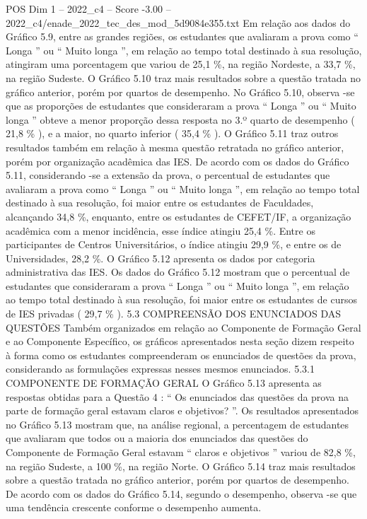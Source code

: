 \begin{textsample}{POS Dim 1 – 2022\_c4 – Score -3.00 – 2022\_c4/enade\_2022\_tec\_des\_mod\_5d9084e355.txt}
Em relação aos dados do Gráfico 5.9, entre as grandes regiões, os estudantes que avaliaram a prova como “ Longa ” ou “ Muito longa ”, em relação ao tempo total destinado à sua resolução, atingiram uma porcentagem que variou de 25,1 \%, na região Nordeste, a 33,7 \%, na região Sudeste.
O Gráfico 5.10 traz mais resultados sobre a questão tratada no gráfico anterior, porém por quartos de desempenho.
No Gráfico 5.10, observa -se que as proporções de estudantes que consideraram a prova “ Longa ” ou “ Muito longa ” obteve a menor proporção dessa resposta no 3.º quarto de desempenho ( 21,8 \% ), e a maior, no quarto inferior ( 35,4 \% ).
O Gráfico 5.11 traz outros resultados também em relação à mesma questão retratada no gráfico anterior, porém por organização acadêmica das IES.
De acordo com os dados do Gráfico 5.11, considerando -se a extensão da prova, o percentual de estudantes que avaliaram a prova como “ Longa ” ou “ Muito longa ”, em relação ao tempo total destinado à sua resolução, foi maior entre os estudantes de Faculdades, alcançando 34,8 \%, enquanto, entre os estudantes de CEFET/IF, a organização acadêmica com a menor incidência, esse índice atingiu 25,4 \%.
Entre os participantes de Centros Universitários, o índice atingiu 29,9 \%, e entre os de Universidades, 28,2 \%.
O Gráfico 5.12 apresenta os dados por categoria administrativa das IES.
Os dados do Gráfico 5.12 mostram que o percentual de estudantes que consideraram a prova “ Longa ” ou “ Muito longa ”, em relação ao tempo total destinado à sua resolução, foi maior entre os estudantes de cursos de IES privadas ( 29,7 \% ). 5.3 COMPREENSÃO DOS ENUNCIADOS DAS QUESTÕES Também organizados em relação ao Componente de Formação Geral e ao Componente Específico, os gráficos apresentados nesta seção dizem respeito à forma como os estudantes compreenderam os enunciados de questões da prova, considerando as formulações expressas nesses mesmos enunciados. 5.3.1 COMPONENTE DE FORMAÇÃO GERAL O Gráfico 5.13 apresenta as respostas obtidas para a Questão 4 : “ Os enunciados das questões da prova na parte de formação geral estavam claros e objetivos? ”.
Os resultados apresentados no Gráfico 5.13 mostram que, na análise regional, a percentagem de estudantes que avaliaram que todos ou a maioria dos enunciados das questões do Componente de Formação Geral estavam “ claros e objetivos ” variou de 82,8 \%, na região Sudeste, a 100 \%, na região Norte.
O Gráfico 5.14 traz mais resultados sobre a questão tratada no gráfico anterior, porém por quartos de desempenho.
De acordo com os dados do Gráfico 5.14, segundo o desempenho, observa -se que uma tendência crescente conforme o desempenho aumenta.

\end{textsample}
